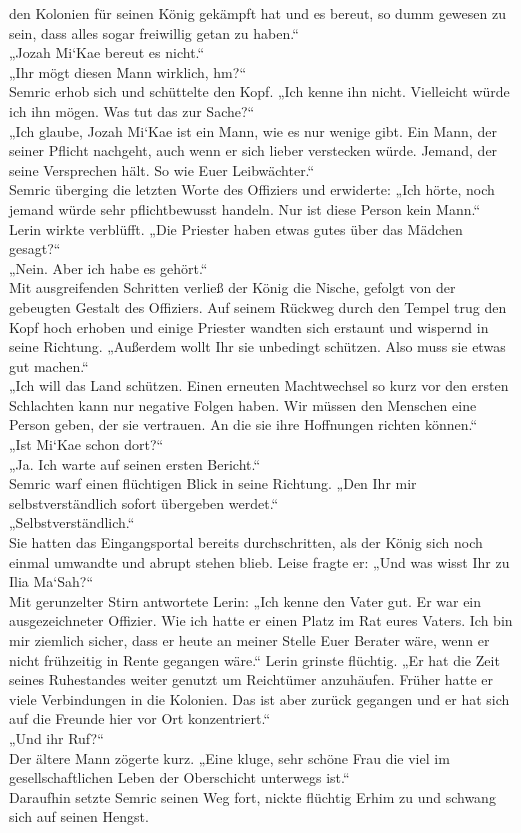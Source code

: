 den Kolonien für seinen König gekämpft hat und es bereut, so dumm gewesen zu sein, dass alles sogar 
freiwillig getan zu haben.“\\
„Jozah Mi‘Kae bereut es nicht.“\\
„Ihr mögt diesen Mann wirklich, hm?“\\
Semric erhob sich und schüttelte den Kopf. „Ich kenne ihn nicht. Vielleicht würde ich ihn mögen. Was 
tut das zur Sache?“\\
„Ich glaube, Jozah Mi‘Kae ist ein Mann, wie es nur wenige gibt. Ein Mann, der seiner Pflicht 
nachgeht, auch wenn er sich lieber verstecken würde. Jemand, der seine Versprechen hält. So wie Euer 
Leibwächter.“\\
Semric überging die letzten Worte des Offiziers und erwiderte: „Ich hörte, noch jemand würde sehr 
pflichtbewusst handeln. Nur ist diese Person kein Mann.“\\
Lerin wirkte verblüfft. „Die Priester haben etwas gutes über das Mädchen gesagt?“\\
„Nein. Aber ich habe es gehört.“\\
Mit ausgreifenden Schritten verließ der König die Nische, gefolgt von der gebeugten Gestalt des 
Offiziers. Auf seinem Rückweg durch den Tempel trug den Kopf hoch erhoben und einige Priester 
wandten sich erstaunt und wispernd in seine Richtung. „Außerdem wollt Ihr sie unbedingt schützen. 
Also muss sie etwas gut machen.“\\
„Ich will das Land schützen. Einen erneuten Machtwechsel so kurz vor den ersten Schlachten kann nur 
negative Folgen haben. Wir müssen den Menschen eine Person geben, der sie vertrauen. An die sie ihre 
Hoffnungen richten können.“\\
„Ist Mi‘Kae schon dort?“\\
„Ja. Ich warte auf seinen ersten Bericht.“\\
Semric warf einen flüchtigen Blick in seine Richtung. „Den Ihr mir selbstverständlich sofort 
übergeben werdet.“\\
„Selbstverständlich.“\\
Sie hatten das Eingangsportal bereits durchschritten, als der König sich noch einmal umwandte und 
abrupt stehen blieb. Leise fragte er: „Und was wisst Ihr zu Ilia Ma‘Sah?“\\
Mit gerunzelter Stirn antwortete Lerin: „Ich kenne den Vater gut. Er war ein ausgezeichneter 
Offizier. Wie ich hatte er einen Platz im Rat eures Vaters. Ich bin mir ziemlich sicher, dass er 
heute an meiner Stelle Euer Berater wäre, wenn er nicht frühzeitig in Rente gegangen wäre.“ Lerin 
grinste flüchtig. „Er hat die Zeit seines Ruhestandes weiter genutzt um Reichtümer anzuhäufen. 
Früher hatte er viele Verbindungen in die Kolonien. Das ist aber zurück gegangen und er hat sich auf 
die Freunde hier vor Ort konzentriert.“\\
„Und ihr Ruf?“\\
Der ältere Mann zögerte kurz. „Eine kluge, sehr schöne Frau die viel im gesellschaftlichen Leben der 
Oberschicht unterwegs ist.“\\
Daraufhin setzte Semric seinen Weg fort, nickte flüchtig Erhim zu und schwang sich auf seinen 
Hengst.\\


